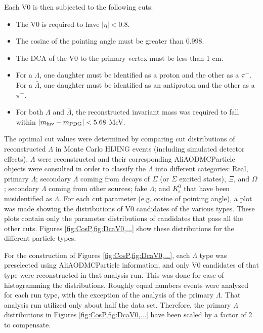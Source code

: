 Each V0 is then subjected to the following cuts:
\begin{itemize}
\item The V0 is required to have $|\eta| < 0.8$.
\item The cosine of the pointing angle must be greater than 0.998.
\item The DCA of the V0 to the primary vertex must be less than 1 cm.
\item For a $\Lambda$, one daughter must be identified as a proton and the other as a $\pi^-$.  For a $\bar{\Lambda}$, one daughter must be identified as an antiproton and the other as a $\pi^+$.
\item For both $\Lambda$ and $\bar{\Lambda}$, the reconstructed invariant mass was required to fall within $\left\lvert m_\mathrm{inv}-m_\mathrm{PDG}\right\rvert < 5.68$ MeV.
\end{itemize}

The optimal cut values were determined by comparing cut distributions of reconstructed $\Lambda$ in Monte Carlo HIJING events (including simulated detector effects). $\Lambda$ were reconstructed and their corresponding AliAODMCParticle objects were consulted in order to classify the $\Lambda$ into different categories: Real, primary $\Lambda$; secondary $\Lambda$ coming from decays of $\Sigma$ (or $\Sigma$ excited states), $\Xi$, and $\Omega$; secondary $\Lambda$ coming from other sources; fake $\Lambda$; and $K^0_\mathrm{s}$ that have been misidentified as $\Lambda$.  For each cut parameter (e.g. cosine of pointing angle), a plot was made showing the distributions of V0 candidates of the various types.  These plots contain only the parameter distributions of candidates that pass all the other cuts.  Figures \ref{fig:CosP,fig:DcaV0,...} show these distributions for the different particle types.  

\begin{figure}
\end{figure}

For the construction of Figures \ref{fig:CosP,fig:DcaV0,...}, each $\Lambda$ type was preselected using AliAODMCParticle information, and only V0 candidates of that type were reconstructed in that analysis run. This was done for ease of histogramming the distributions.  Roughly equal numbers events were analyzed for each run type, with the exception of the analysis of the primary $\Lambda$.  That analysis run utilized only about half the data set.  Therefore, the primary $\Lambda$ distributions in Figures \ref{fig:CosP,fig:DcaV0,...} have been scaled by a factor of 2 to compensate.

